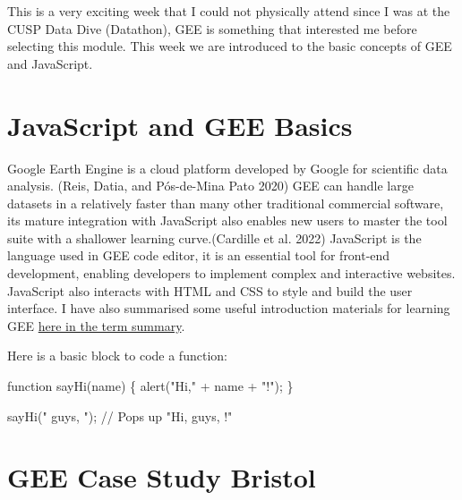 \documentclass[
  letterpaper,
  DIV=11,
  numbers=noendperiod]{scrreprt}
\newenvironment{Shaded}{\begin{snugshade}}{\end{snugshade}}
\newcommand{\CommentTok}[1]{\textcolor[rgb]{0.37,0.37,0.37}{#1}}
\newcommand{\FunctionTok}[1]{\textcolor[rgb]{0.28,0.35,0.67}{#1}}
\newcommand{\KeywordTok}[1]{\textcolor[rgb]{0.00,0.23,0.31}{#1}}
\newcommand{\NormalTok}[1]{\textcolor[rgb]{0.00,0.23,0.31}{#1}}
\newcommand{\OperatorTok}[1]{\textcolor[rgb]{0.37,0.37,0.37}{#1}}
\newcommand{\StringTok}[1]{\textcolor[rgb]{0.13,0.47,0.30}{#1}}
\begin{document}

This is a very exciting week that I could not physically attend since I
was at the CUSP Data Dive (Datathon), GEE is something that interested
me before selecting this module. This week we are introduced to the
basic concepts of GEE and JavaScript.

\hypertarget{javascript-and-gee-basics}{%
\section*{JavaScript and GEE Basics}\label{javascript-and-gee-basics}}


Google Earth Engine is a cloud platform developed by Google for
scientific data analysis. (Reis, Datia, and Pós-de-Mina Pato 2020) GEE
can handle large datasets in a relatively faster than many other
traditional commercial software, its mature integration with JavaScript
also enables new users to master the tool suite with a shallower
learning curve.(Cardille et al. 2022) JavaScript is the language used in
GEE code editor, it is an essential tool for front-end development,
enabling developers to implement complex and interactive websites.
JavaScript also interacts with HTML and CSS to style and build the user
interface. I have also summarised some useful introduction materials for
learning GEE \protect\hyperlink{remote-sensing-term-recap}{here in the
term summary}.

Here is a basic block to code a function:

\begin{Shaded}
\begin{Highlighting}[]
\KeywordTok{function} \FunctionTok{sayHi}\NormalTok{(name) \{}
    \FunctionTok{alert}\NormalTok{(}\StringTok{"Hi,"} \OperatorTok{+}\NormalTok{ name }\OperatorTok{+} \StringTok{"!"}\NormalTok{)}\OperatorTok{;}
\NormalTok{\}}

\FunctionTok{sayHi}\NormalTok{(}\StringTok{" guys, "}\NormalTok{)}\OperatorTok{;} \CommentTok{// Pops up "Hi, guys, !"}
\end{Highlighting}
\end{Shaded}

\hypertarget{gee-case-study-bristol}{%
\section*{GEE Case Study Bristol}\label{gee-case-study-bristol}}
\end{document}
